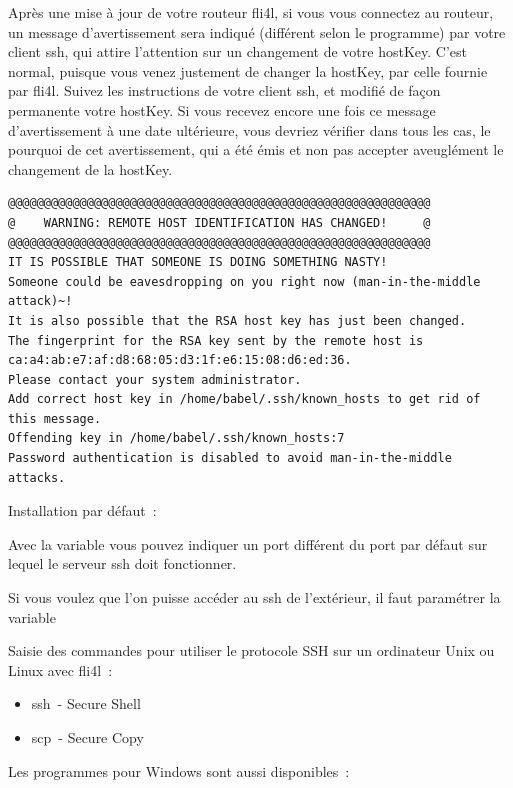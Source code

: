 \begin{description}
  Après une mise à jour de votre routeur fli4l, si vous vous connectez au
  routeur, un message d'avertissement sera indiqué (différent selon le programme)
  par votre client ssh, qui attire l'attention sur un changement de votre hostKey.
  C'est normal, puisque vous venez justement de changer la hostKey, par celle
  fournie par fli4l. Suivez les instructions de votre client ssh, et modifié de
  façon permanente votre hostKey. Si vous recevez encore une fois ce message
  d'avertissement à une date ultérieure, vous devriez vérifier dans tous les
  cas, le pourquoi de cet avertissement, qui a été émis et non pas accepter
  aveuglément le changement de la hostKey. 

\begin{verbatim}
@@@@@@@@@@@@@@@@@@@@@@@@@@@@@@@@@@@@@@@@@@@@@@@@@@@@@@@@@@@
@    WARNING: REMOTE HOST IDENTIFICATION HAS CHANGED!     @
@@@@@@@@@@@@@@@@@@@@@@@@@@@@@@@@@@@@@@@@@@@@@@@@@@@@@@@@@@@
IT IS POSSIBLE THAT SOMEONE IS DOING SOMETHING NASTY!
Someone could be eavesdropping on you right now (man-in-the-middle attack)~!
It is also possible that the RSA host key has just been changed.
The fingerprint for the RSA key sent by the remote host is
ca:a4:ab:e7:af:d8:68:05:d3:1f:e6:15:08:d6:ed:36.
Please contact your system administrator.
Add correct host key in /home/babel/.ssh/known_hosts to get rid of this message.
Offending key in /home/babel/.ssh/known_hosts:7
Password authentication is disabled to avoid man-in-the-middle attacks.
\end{verbatim}


  Installation par défaut~: 

  Avec la variable  vous pouvez indiquer un port différent
  du port par défaut sur lequel le serveur ssh doit fonctionner.

  Si vous voulez que l'on puisse accéder au ssh de l'extérieur, il faut 
  paramétrer la variable 

  Saisie des commandes pour utiliser le protocole SSH sur un ordinateur Unix
  ou Linux avec fli4l~:
  \begin{itemize}
  \item ssh~- Secure Shell
  \item scp~- Secure Copy
  \end{itemize}

  Les programmes pour Windows sont aussi disponibles~:
  \linebreak
  \linebreak
  \linebreak


\end{description}
